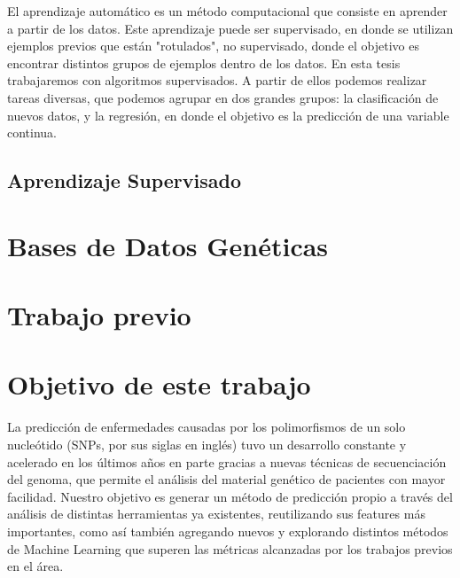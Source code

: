 El aprendizaje automático es un método computacional que consiste en aprender a partir de los datos. Este aprendizaje puede ser supervisado, en donde se utilizan ejemplos previos que están "rotulados", no supervisado, donde el objetivo es encontrar distintos grupos de ejemplos dentro de los datos. En esta tesis trabajaremos con algoritmos supervisados. A partir de ellos podemos realizar tareas diversas, que podemos agrupar en dos grandes grupos: la clasificación de nuevos datos, y la regresión, en donde el objetivo es la predicción de una variable continua. 

\subsection{Aprendizaje Supervisado}


\section{Bases de Datos Genéticas}

\section{Trabajo previo}

\section{Objetivo de este trabajo}

La predicción de enfermedades causadas por los polimorfismos de un solo nucleótido (SNPs, por sus siglas en inglés) tuvo un desarrollo constante y acelerado en los últimos años en parte gracias a nuevas técnicas de secuenciación del genoma, que permite el análisis del material genético de pacientes con mayor facilidad. Nuestro objetivo es generar un método de predicción propio a través del análisis de distintas herramientas ya existentes, reutilizando sus features más importantes, como así también agregando nuevos y explorando distintos métodos de Machine Learning que superen las métricas alcanzadas por los trabajos previos en el área.


